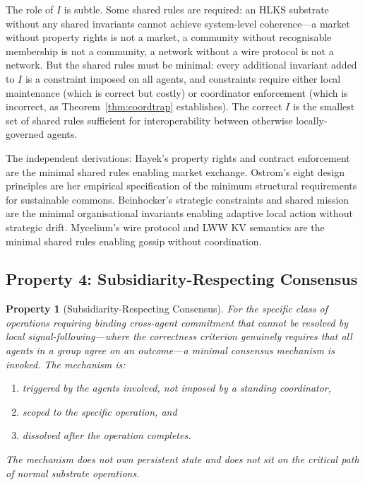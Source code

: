 \documentclass[11pt]{article}
\theoremstyle{definition}
\theoremstyle{plain}
\theoremstyle{plain}
\newtheorem*{property}{Property}
\begin{document}
The role of $I$ is subtle. Some shared rules are required: an HLKS substrate
without any shared invariants cannot achieve system-level coherence---a
market without property rights is not a market, a community without
recognisable membership is not a community, a network without a wire protocol
is not a network. But the shared rules must be minimal: every additional
invariant added to $I$ is a constraint imposed on all agents, and constraints
require either local maintenance (which is correct but costly) or coordinator
enforcement (which is incorrect, as Theorem~\ref{thm:coordtrap} establishes).
The correct $I$ is the smallest set of shared rules sufficient for
interoperability between otherwise locally-governed agents.

The independent derivations: Hayek's property rights and contract enforcement
are the minimal shared rules enabling market exchange. Ostrom's eight design
principles are her empirical specification of the minimum structural
requirements for sustainable commons. Beinhocker's strategic constraints and
shared mission are the minimal organisational invariants enabling adaptive
local action without strategic drift. Mycelium's wire protocol and LWW KV
semantics are the minimal shared rules enabling gossip without coordination.

\subsection{Property 4: Subsidiarity-Respecting Consensus}

\begin{property}[Subsidiarity-Respecting Consensus]
For the specific class of operations requiring binding cross-agent commitment
that cannot be resolved by local signal-following---where the correctness
criterion genuinely requires that all agents in a group agree on an
outcome---a minimal consensus mechanism is invoked. The mechanism is:
\begin{enumerate}[label=(\alph*)]
\item triggered by the agents involved, not imposed by a standing coordinator,
\item scoped to the specific operation, and
\item dissolved after the operation completes.
\end{enumerate}
The mechanism does not own persistent state and does not sit on the critical
path of normal substrate operations.
\end{property}
\end{document}
